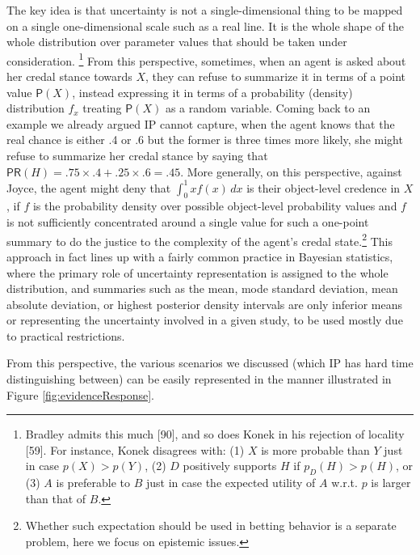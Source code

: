\documentclass[
  10pt,
  dvipsnames,enabledeprecatedfontcommands]{scrartcl}
\begin{document}
The key idea is that uncertainty is not a single-dimensional thing to be
mapped on a single one-dimensional scale such as a real line. It is the
whole shape of the whole distribution over parameter values that should
be taken under consideration. \footnote{Bradley admits this
  much {[}90{]}, and so does Konek in his rejection of locality
  {[}59{]}. For instance, Konek disagrees with: (1) \(X\) is more
  probable than \(Y\) just in case \(p(X)>p(Y)\), (2) \(D\) positively
  supports \(H\) if \(p_D(H)> p(H)\), or (3) \(A\) is preferable to
  \(B\) just in case the expected utility of \(A\) w.r.t. \(p\) is
  larger than that of \(B\).} From this perspective, sometimes, when an
agent is asked about her credal stance towards \(X\), they can refuse to
summarize it in terms of a point value \(\mathsf{P}(X)\), instead
expressing it in terms of a probability (density) distribution \(f_x\)
treating \(\mathsf{P}(X)\) as a random variable. Coming back to an
example we already argued \textsf{IP} cannot capture, when the agent
knows that the real chance is either .4 or .6 but the former is three
times more likely, she might refuse to summarize her credal stance by
saying that \(\mathsf{PR}(H) = .75 \times .4 + .25 \times .6 = .45\).
More generally, on this perspective, against Joyce, the agent might deny
that \(\int_{0}^{1} x f(x) \, dx\) is their object-level credence in
\(X\), if \(f\) is the probability density over possible object-level
probability values and \(f\) is not sufficiently concentrated around a
single value for such a one-point summary to do the justice to the
complexity of the agent's credal state.\footnote{Whether such
  expectation should be used in betting behavior is a separate problem,
  here we focus on epistemic issues.} This approach in fact lines up
with a fairly common practice in Bayesian statistics, where the primary
role of uncertainty representation is assigned to the whole
distribution, and summaries such as the mean, mode standard deviation,
mean absolute deviation, or highest posterior density intervals are only
inferior means or representing the uncertainty involved in a given
study, to be used mostly due to practical restrictions.

From this perspective, the various scenarios we discussed (which
\textsf{IP} has hard time distinguishing between) can be easily
represented in the manner illustrated in Figure
\ref{fig:evidenceResponse}.
\end{document}
